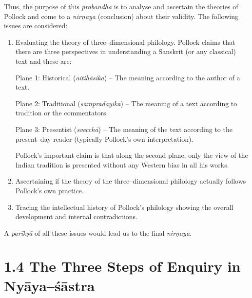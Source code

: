 Thus, the purpose of this \textit{prabandha} is to analyse and ascertain the theories of Pollock and come to a \textit{nirṇaya} (conclusion) about their validity. The following issues are considered:

\begin{enumerate}
\itemsep=0pt
\item 
 Evaluating the theory of three–dimensional philology. Pollock claims that there are three perspectives in understanding a Sanskrit (or any classical) text and these are:

\begin{myquote}
Plane 1: Historical (\textit{aitihāsika}) – The meaning according to the author of a text.
\end{myquote}

\begin{myquote}
Plane 2: Traditional (\textit{sāmpradāyika}) – The meaning of a text according to tradition or the commentators.
\end{myquote}

\begin{myquote}
Plane 3: Presentist (\textit{svecchā}) – The meaning of the text according to the present–day reader (typically Pollock’s own interpretation).
\end{myquote}

 Pollock’s important claim is that along the second plane, only the view of the Indian tradition is presented without any Western bias in all his works.

 \item Ascertaining if the theory of the three–dimensional philology actually follows Pollock’s own practice.

 \item Tracing the intellectual history of Pollock’s philology showing the overall development and internal contradictions.

\end{enumerate}

A \textit{parīkṣā} of all these issues would lead us to the final \textit{nirṇaya}.

\vspace{-.3cm}

\section*{1.4 The Three Steps of Enquiry in Nyāya–śāstra}

